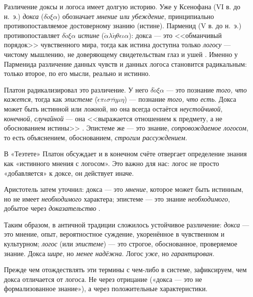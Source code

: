 \documentclass[12pt,a4paper]{article}
\begin{document}
Различение доксы и логоса имеет долгую историю. Уже у Ксенофана (VI в. до н.~э.) \emph{докса} ($\delta\acute{o}\xi\alpha$)
обозначает \emph{мнение или убеждение}, принципиально противопоставляемое достоверному знанию (истине). Парменид (V в. до н.~э.)
противопоставляет $\delta\acute{o}\xi\alpha$ \emph{истине} ($\grave{\alpha}\lambda\acute{\eta}\theta\epsilon\iota\alpha$):
докса --- это <<обманчивый порядок>> чувственного мира, тогда как истина доступна только \emph{логосу} --- чистому мышлению,
не доверяющему свидетельствам глаз и ушей \cite{diels}. Именно у Парменида различение данных чувств и данных логоса становится
радикальным: только второе, по его мысли, реально и истинно.

Платон радикализировал это различение. У него $\delta\acute{o}\xi\alpha$ --- это
познание \emph{того, что кажется}, тогда как \emph{эпистеме}
($\grave{\epsilon}\pi\iota\sigma\tau\acute{\eta}\mu\eta$) --- познание \emph{того,
что есть}. Докса может быть истинной или ложной, но она всегда остаётся
\emph{неустойчивой}, \emph{конечной}, \emph{случайной} --- она <<выражается
отношением к предмету, а не обоснованием истины>> \cite{plato}. Эпистеме же --- это
знание, \emph{сопровождаемое логосом}, то есть объяснением, обоснованием,
\emph{строгим рассуждением}.

В «Теэтете» Платон обсуждает и в конечном счёте отвергает определение знания как
«истинного мнения с логосом». Это важно для нас: логос не просто «добавляется»
к доксе, он действует иначе.

Аристотель затем уточнил: докса --- это \emph{мнение}, которое может быть
истинным, но не имеет \emph{необходимого} характера; эпистеме --- это знание
\emph{необходимого}, добытое через \emph{доказательство} \cite{aristotle}.

Таким образом, в античной традиции сложилось устойчивое различение: \emph{докса} ---
это мнение, опыт, вероятностное суждение, укоренённое в чувственном и культурном;
\emph{логос} (или \emph{эпистеме}) --- это строгое, обоснованное, проверяемое
знание. Докса \emph{шире}, но \emph{менее надёжна}. Логос \emph{уже}, но
\emph{гарантирован}.

Прежде чем отождествлять эти термины с чем-либо в системе, зафиксируем, чем докса
отличается от логоса. Не через отрицание («докса --- это не формализованное знание»),
а через положительные характеристики.
\end{document}
